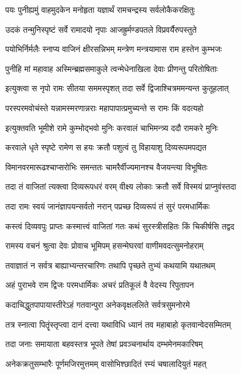 \twolineshloka
{पयः पुनीह्यमुं वाहमुदकेन मनोहृता}
{यज्ञार्थं रामचन्द्रस्य सर्वलोकैकरक्षितुः}%

\twolineshloka
{उदकं तन्मुनिस्पृष्टं सर्वे रामादयो नृपाः}
{आजह्रुर्मण्डपतले विप्रवर्यैरुपस्तुते}%

\twolineshloka
{पयोभिर्निर्मलैः स्नाप्य वाजिनं क्षीरसन्निभम्}
{मन्त्रेण मन्त्रयामास राम हस्तेन कुम्भजः}%

\twolineshloka
{पुनीहि मां महावाह अस्मिन्ब्रह्मसमाकुले}
{त्वन्मेधेनाखिला देवाः प्रीणन्तु परितोषिताः}%

\twolineshloka
{इत्युक्त्वा स नृपो रामः सीतया सममस्पृशत्}
{तदा सर्वे द्विजाश्चित्रममन्यन्त कुतूहलात्}%

\twolineshloka
{परस्परमवोचंस्ते यन्नामस्मरणान्नराः}
{महापापात्प्रमुच्यन्ते स रामः किं वदत्यहो}%

\twolineshloka
{इत्युक्तवति भूमीशे रामे कुम्भोद्भवो मुनिः}
{करवालं चाभिमन्त्र्य ददौ रामकरे मुनिः}%

\twolineshloka
{करवाले धृते स्पृष्टे रामेण स हयः क्रतौ}
{पशुत्वं तु विहायाशु दिव्यरूपमपद्यत}%

\twolineshloka
{विमानवरमारूढश्चाप्सरोभिः समन्ततः}
{चामरैर्वीज्यमानश्च वैजयन्त्या विभूषितः}%

\twolineshloka
{तदा तं वाजितां त्यक्त्वा दिव्यरूपधरं वरम्}
{वीक्ष्य लोकाः क्रतौ सर्वे विस्मयं प्राप्नुवंस्तदा}%

\twolineshloka
{तदा रामः स्वयं जानंज्ञापयन्सर्वतो नरान्}
{पप्रच्छ दिव्यरूपं तं सुरं परमधार्मिकः}%

\twolineshloka
{कस्त्वं दिव्यवपुः प्राप्तः कस्मात्त्वं वाजितां गतः}
{कथं सुरस्त्रीसहितः किं चिकीर्षसि तद्वद}%

\twolineshloka
{रामस्य वचनं श्रुत्वा देवः प्रोवाच भूमिपम्}
{हसन्मेघरवां वाणीमवदत्सुमनोहराम्}%

\twolineshloka
{तवाज्ञातं न सर्वत्र बाह्याभ्यन्तरचारिणः}
{तथापि पृच्छते तुभ्यं कथयामि यथातथम्}%

\twolineshloka
{अहं पुराभवे राम द्विजः परमधार्मिकः}
{अचरं प्रतिकूलं वै वेदस्य रिपुतापन}%

\twolineshloka
{कदाचिद्धुतपापायास्तीरेऽहं गतवान्पुरा}
{अनेकवृक्षललिते सर्वत्रसुमनोरमे}%

\twolineshloka
{तत्र स्नात्वा पितॄंस्तृप्त्वा दानं दत्त्वा यथाविधि}
{ध्यानं तव महाबाहो कृतवान्वेदसम्मितम्}%

\twolineshloka
{तदा जनाः समायाता बहवस्तत्र भूपते}
{तेषां प्रवञ्चनार्थाय दम्भमेनमकारिषम्}%

\twolineshloka
{अनेकक्रतुसम्भारैः पूर्णमजिरमुत्तमम्}
{वासोभिश्छादितं रम्यं चषालादियुतं महत्}%

